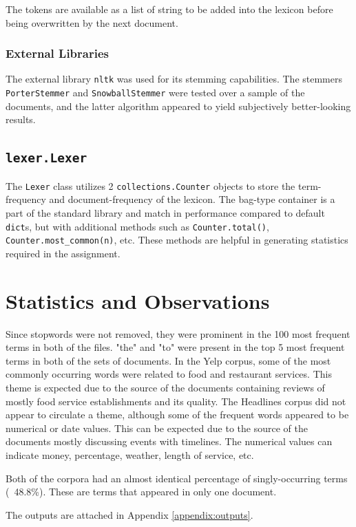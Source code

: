 \documentclass[11pt]{article}
\begin{document}
The tokens are available as a list of string to be added into the lexicon before being overwritten by the next document.

\subsubsection{External Libraries}
The external library \texttt{nltk} was used for its stemming capabilities. The stemmers \texttt{PorterStemmer} and \texttt{SnowballStemmer} were tested over a sample of the documents, and the latter algorithm appeared to yield subjectively better-looking results.

\subsection{\texttt{lexer.Lexer}}
The \texttt{Lexer} class utilizes 2 \texttt{collections.Counter} objects to store the term-frequency and document-frequency of the lexicon. The bag-type container is a part of the standard library and match in performance compared to default \texttt{dict}s, but with additional methods such as \texttt{Counter.total()}, \texttt{Counter.most\_common(n)}, etc. These methods are helpful in generating statistics required in the assignment.

\section{Statistics and Observations}
Since stopwords were not removed, they were prominent in the 100 most frequent terms in both of the files. "the" and "to" were present in the top 5 most frequent terms in both of the sets of documents. In the Yelp corpus, some of the most commonly occurring words were related to food and restaurant services. This theme is expected due to the source of the documents containing reviews of mostly food service establishments and its quality. The Headlines corpus did not appear to circulate a theme, although some of the frequent words appeared to be numerical or date values. This can be expected due to the source of the documents mostly discussing events with timelines. The numerical values can indicate money, percentage, weather, length of service, etc.

Both of the corpora had an almost identical percentage of singly-occurring terms (~48.8\%). These are terms that appeared in only one document.

The outputs are attached in Appendix \ref{appendix:outputs}.
\end{document}
